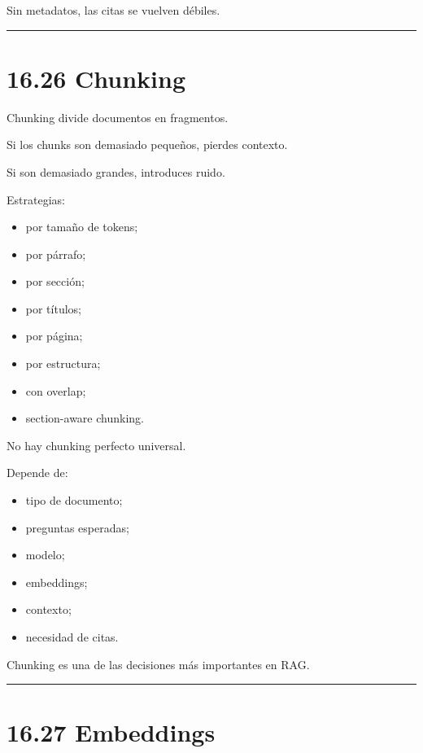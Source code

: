 Sin metadatos, las citas se vuelven débiles.

\begin{center}\rule{0.5\linewidth}{0.5pt}\end{center}

\section{16.26 Chunking}\label{chunking}

Chunking divide documentos en fragmentos.

Si los chunks son demasiado pequeños, pierdes contexto.

Si son demasiado grandes, introduces ruido.

Estrategias:

\begin{itemize}
\tightlist
\item
  por tamaño de tokens;
\item
  por párrafo;
\item
  por sección;
\item
  por títulos;
\item
  por página;
\item
  por estructura;
\item
  con overlap;
\item
  section-aware chunking.
\end{itemize}

No hay chunking perfecto universal.

Depende de:

\begin{itemize}
\tightlist
\item
  tipo de documento;
\item
  preguntas esperadas;
\item
  modelo;
\item
  embeddings;
\item
  contexto;
\item
  necesidad de citas.
\end{itemize}

Chunking es una de las decisiones más importantes en RAG.

\begin{center}\rule{0.5\linewidth}{0.5pt}\end{center}

\section{16.27 Embeddings}\label{embeddings-1}

